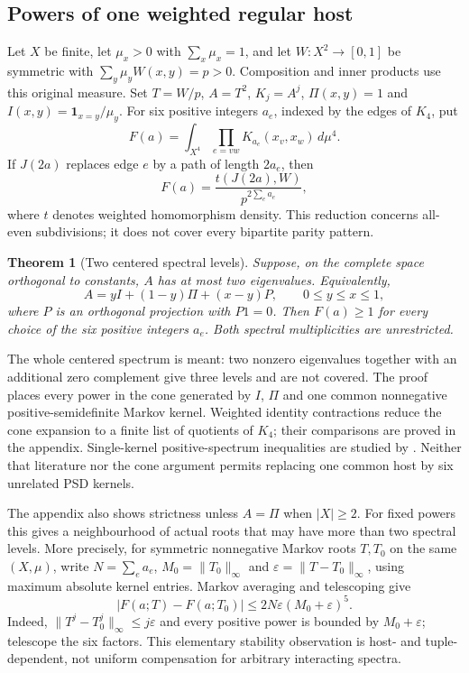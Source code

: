 \documentclass[a4paper,11pt,reqno]{amsart}
\theoremstyle{plain}
\newtheorem{theorem}{Theorem}[section]
\theoremstyle{definition}
\theoremstyle{remark}
\begin{document}
\subsection{Powers of one weighted regular host}
Let $X$ be finite, let $\mu_x>0$ with $\sum_x\mu_x=1$, and let
$W:X^2\to[0,1]$ be symmetric with
$\sum_y\mu_yW(x,y)=p>0$.  Composition and inner products use this
original measure.  Set $T=W/p$, $A=T^2$, $K_j=A^j$,
$\Pi(x,y)=1$ and $I(x,y)=\mathbf1_{x=y}/\mu_y$.
For six positive integers $a_e$, indexed by the edges of $K_4$, put
\[
 F(a)=\int_{X^4}\prod_{e=vw}K_{a_e}(x_v,x_w)\,d\mu^4.
\]
If $J(2a)$ replaces edge $e$ by a path of length $2a_e$, then
\[
 F(a)=\frac{t(J(2a),W)}{p^{2\sum_ea_e}},
\]
where $t$ denotes weighted homomorphism density.
This reduction concerns all-even subdivisions;
it does not cover every bipartite parity pattern.

\begin{theorem}[Two centered spectral levels]
\label{theorem-two-level-density}
Suppose, on the complete space orthogonal to constants,
$A$ has at most two eigenvalues.  Equivalently,
\[
 A=yI+(1-y)\Pi+(x-y)P,
 \qquad 0\le y\le x\le1,
\]
where $P$ is an orthogonal projection with $P1=0$.  Then
$F(a)\ge1$ for every choice of the six positive integers $a_e$.
Both spectral multiplicities are unrestricted.
\end{theorem}

The whole centered spectrum is meant: two nonzero eigenvalues together
with an additional zero complement give three levels and are not covered.
The proof places every power in the cone generated by $I$, $\Pi$ and
one common nonnegative positive-semidefinite Markov kernel.  Weighted
identity contractions reduce the cone expansion to a finite list of
quotients of $K_4$; their comparisons are proved in the appendix.
Single-kernel positive-spectrum inequalities are studied by
\citet{sidorenko2021}.  Neither that literature nor the cone argument
permits replacing one common host by six unrelated PSD kernels.

The appendix also shows strictness unless $A=\Pi$ when $|X|\ge2$.
For fixed powers this gives a neighbourhood of actual roots that may have
more than two spectral levels.  More precisely, for symmetric nonnegative
Markov roots $T,T_0$ on the same $(X,\mu)$, write
$N=\sum_ea_e$, $M_0=\|T_0\|_\infty$ and
$\varepsilon=\|T-T_0\|_\infty$, using maximum absolute kernel entries.
Markov averaging and telescoping give
\[
 |F(a;T)-F(a;T_0)|\le2N\varepsilon(M_0+\varepsilon)^5.
\]
Indeed, $\|T^j-T_0^j\|_\infty\le j\varepsilon$ and every positive
power is bounded by $M_0+\varepsilon$; telescope the six factors.
This elementary stability observation is host- and tuple-dependent,
not uniform compensation for arbitrary interacting spectra.
\end{document}
